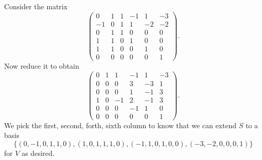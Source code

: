 \begin{Exercise}
\begin{enumerate}[(a)]
\begin{solution}
			Consider the matrix
			$$
			\begin{pmatrix}
			0 & 1 & 1 & -1 & 1 & -3 \\
			-1 & 0 & 1 & 1 & -2 & -2 \\
			0 & 1 & 1 & 0 & 0 & 0 \\
			1 & 1 & 0 & 1 & 0 & 0 \\
			1 & 1 & 0 & 0 & 1 & 0 \\
			0 & 0 & 0 & 0 & 0 & 1
			\end{pmatrix}.
			$$
			Now reduce it to obtain
			$$
			\begin{pmatrix}
			0 & 1 & 1 & -1 & 1 & -3 \\
			0 & 0 & 0 & 3 & -3 & 1 \\
			0 & 0 & 0 & 1 & -1 & 3 \\
			1 & 0 & -1 & 2 & -1 & 3 \\
			0 & 0 & 0 & -1 & 1 & 0 \\
			0 & 0 & 0 & 0 & 0 & 1
			\end{pmatrix}.
			$$
			We pick the first, second, forth, sixth column to know that
			we can extend $S$ to a basis 
			$$
			\{(0,-1,0,1,1,0),(1,0,1,1,1,0),(-1,1,0,1,0,0),(-3,-2,0,0,0,1)\}
			$$
			for $V$ as desired.
		\end{solution}
		
	\end{enumerate}
\end{Exercise}